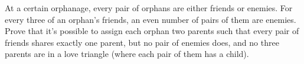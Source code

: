 At a certain orphanage, every pair of orphans are either friends or enemies. For every three of an orphan's friends, an even number of pairs of them are enemies. Prove that it's possible to assign each orphan two parents such that every pair of friends shares exactly one parent, but no pair of enemies does, and no three parents are in a love triangle (where each pair of them has a child).